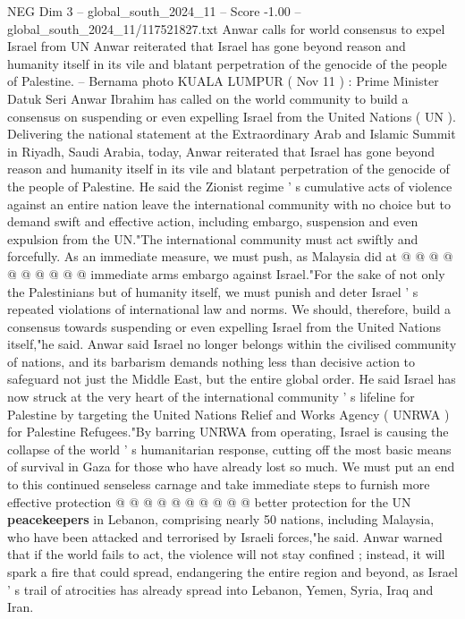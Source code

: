 \begin{textsample}{NEG Dim 3 – global\_south\_2024\_11 – Score -1.00 – global\_south\_2024\_11/117521827.txt}  \label{ex:f3_neg_151}
Anwar calls for world consensus to expel Israel from UN Anwar reiterated that Israel has gone beyond reason and humanity itself in its vile and blatant perpetration of the genocide of the people of Palestine. -- Bernama photo KUALA LUMPUR ( Nov 11 ) : Prime Minister Datuk Seri Anwar Ibrahim has called on the world community to build a consensus on suspending or even expelling Israel from the United Nations ( UN ).
Delivering the national statement at the Extraordinary Arab and Islamic Summit in Riyadh, Saudi Arabia, today, Anwar reiterated that Israel has gone beyond reason and humanity itself in its vile and blatant perpetration of the genocide of the people of Palestine.
He said the Zionist regime ' s cumulative acts of violence against an entire nation leave the international community with no choice but to demand swift and effective action, including embargo, suspension and even expulsion from the UN."The international community must act swiftly and forcefully.
As an immediate measure, we must push, as Malaysia did at @ @ @ @ @ @ @ @ @ @ immediate arms embargo against Israel."For the sake of not only the Palestinians but of humanity itself, we must punish and deter Israel ' s repeated violations of international law and norms.
We should, therefore, build a consensus towards suspending or even expelling Israel from the United Nations itself,"he said.
Anwar said Israel no longer belongs within the civilised community of nations, and its barbarism demands nothing less than decisive action to safeguard not just the Middle East, but the entire global order.
He said Israel has now struck at the very heart of the international community ' s lifeline for Palestine by targeting the United Nations Relief and Works Agency ( UNRWA ) for Palestine Refugees."By barring UNRWA from operating, Israel is causing the collapse of the world ' s humanitarian response, cutting off the most basic means of survival in Gaza for those who have already lost so much.
We must put an end to this continued senseless carnage and take immediate steps to furnish more effective protection @ @ @ @ @ @ @ @ @ @ better protection for the UN \textbf{peacekeepers} in Lebanon, comprising nearly 50 nations, including Malaysia, who have been attacked and terrorised by Israeli forces,"he said.
Anwar warned that if the world fails to act, the violence will not stay confined ; instead, it will spark a fire that could spread, endangering the entire region and beyond, as Israel ' s trail of atrocities has already spread into Lebanon, Yemen, Syria, Iraq and Iran.

\end{textsample}
